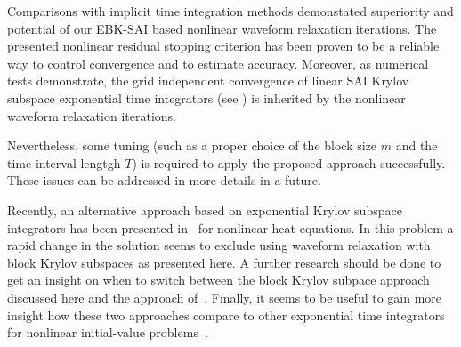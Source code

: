 \documentclass[sn-aps]{sn-jnl}
\theoremstyle{thmstyleone}%
\theoremstyle{thmstyletwo}%
\theoremstyle{thmstylethree}%
\begin{document}
Comparisons with implicit time integration methods demonstated 
superiority and potential of our EBK-SAI based nonlinear waveform
relaxation iterations.  
The presented nonlinear residual stopping criterion has been proven to
be a reliable way to control convergence and to estimate
accuracy.  
Moreover, as numerical tests demonstrate, the grid independent 
convergence of linear SAI Krylov subspace exponential time integrators
(see \cite{MoretNovati04,EshofHochbruck06,Gri12})
is inherited by the nonlinear waveform relaxation iterations.

Nevertheless, some tuning (such as a proper choice of the block size 
$m$ and the time interval lengtgh $T$) is required to apply the proposed approach
successfully.  These issues can be addressed in more details
in a future. 

Recently, an alternative approach based on exponential Krylov subspace
integrators has been presented in~\cite{BotchevZhukov2023} for nonlinear heat 
equations.  In this problem a rapid change in the solution
seems to exclude using waveform relaxation with block Krylov subspaces
as presented here.  
A further research should be done to get an insight on when to switch between
the block Krylov subpace approach discussed here and the approach of~\cite{BotchevZhukov2023}.
Finally, it seems to be useful to gain more insight how these two approaches
compare to other exponential time integrators for nonlinear 
initial-value 
problems~\cite{HochbruckOstermann2010,HippHochbruckOstermann14,HansenOstermann2016}. 
 


%
\end{document}
